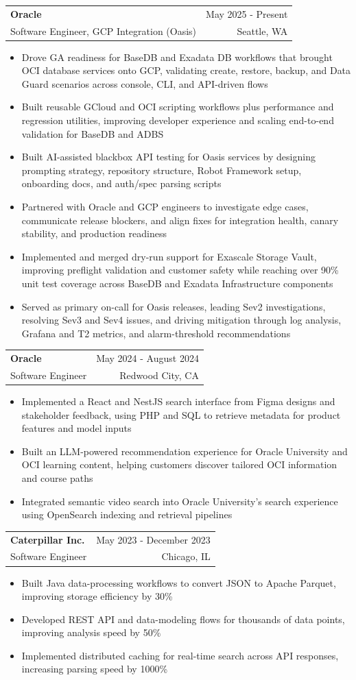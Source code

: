 \documentclass[letterpaper,11pt]{article}
\makeatletter
\newcommand{\resumeItem}[1]{
  \item\small{
    {#1 \vspace{-1pt}}
  }
}
\newcommand{\resumeSubheading}[4]{
  \vspace{-2pt}\item
    \begin{tabular*}{0.97\textwidth}[t]{l@{\extracolsep{\fill}}r}
      \textbf{#1} & #2 \\
      {\small#3} & {\small #4} \\
    \end{tabular*}\vspace{-7pt}
}
\newcommand{\resumeItemListStart}{\begin{itemize}[leftmargin=0.18in,itemsep=1pt,topsep=2pt]}
\newcommand{\resumeItemListEnd}{\end{itemize}\vspace{-5pt}}
\makeatother
\begin{document}
    \resumeSubheading
  {Oracle}{May 2025 - Present}
  {Software Engineer, GCP Integration (Oasis)}{Seattle, WA}
  \resumeItemListStart
    \resumeItem{Drove GA readiness for BaseDB and Exadata DB workflows that brought OCI database services onto GCP, validating create, restore, backup, and Data Guard scenarios across console, CLI, and API-driven flows}
    \resumeItem{Built reusable GCloud and OCI scripting workflows plus performance and regression utilities, improving developer experience and scaling end-to-end validation for BaseDB and ADBS}
    \resumeItem{Built AI-assisted blackbox API testing for Oasis services by designing prompting strategy, repository structure, Robot Framework setup, onboarding docs, and auth/spec parsing scripts}
    \resumeItem{Partnered with Oracle and GCP engineers to investigate edge cases, communicate release blockers, and align fixes for integration health, canary stability, and production readiness}
    \resumeItem{Implemented and merged dry-run support for Exascale Storage Vault, improving preflight validation and customer safety while reaching over 90\% unit test coverage across BaseDB and Exadata Infrastructure components}
    \resumeItem{Served as primary on-call for Oasis releases, leading Sev2 investigations, resolving Sev3 and Sev4 issues, and driving mitigation through log analysis, Grafana and T2 metrics, and alarm-threshold recommendations}
  \resumeItemListEnd

    \resumeSubheading
      {Oracle}{May 2024 - August 2024}
      {Software Engineer}{Redwood City, CA}
      \resumeItemListStart
        \resumeItem{Implemented a React and NestJS search interface from Figma designs and stakeholder feedback, using PHP and SQL to retrieve metadata for product features and model inputs}
        \resumeItem{Built an LLM-powered recommendation experience for Oracle University and OCI learning content, helping customers discover tailored OCI information and course paths}
        \resumeItem{Integrated semantic video search into Oracle University's search experience using OpenSearch indexing and retrieval pipelines}
      \resumeItemListEnd

    \resumeSubheading
      {Caterpillar Inc.}{May 2023 - December 2023}
      {Software Engineer}{Chicago, IL}
      \resumeItemListStart
        \resumeItem{Built Java data-processing workflows to convert JSON to Apache Parquet, improving storage efficiency by 30\%}
        \resumeItem{Developed REST API and data-modeling flows for thousands of data points, improving analysis speed by 50\%}
        \resumeItem{Implemented distributed caching for real-time search across API responses, increasing parsing speed by 1000\%}
      \resumeItemListEnd
\end{document}
